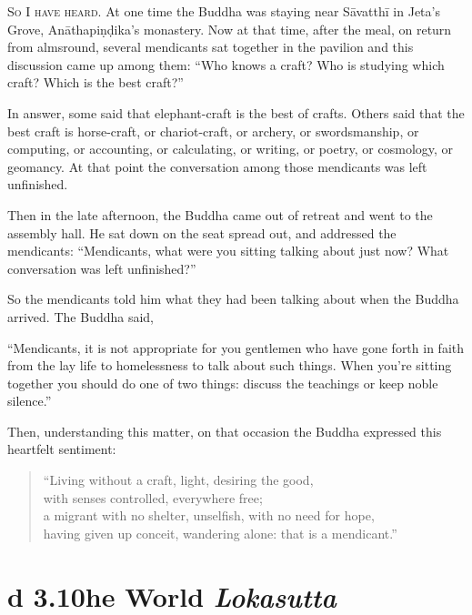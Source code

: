\documentclass[12pt,openany]{book}%
\newcommand*{\suttatitleacronym}[1]{\smaller[2]{#1}\vspace*{.3em}}
\newcommand*{\suttatitletranslation}[1]{\linebreak{#1}}
\newcommand*{\suttatitleroot}[1]{\linebreak\smaller[2]\itshape{#1}}
\newcommand*{\tocacronym}[1]{\hspace*{-3.3em}{#1}\quad}
\newcommand*{\toctranslation}[1]{#1}
\newcommand*{\tocroot}[1]{(\textit{#1})}
\newcommand*{\scevam}[1]{\textsc{#1}}
\begin{document}
\scevam{So I have heard. }At one time the Buddha was staying near \textsanskrit{Sāvatthī} in Jeta’s Grove, \textsanskrit{Anāthapiṇḍika}’s monastery. Now at that time, after the meal, on return from almsround, several mendicants sat together in the pavilion and this discussion came up among them: “Who knows a craft? Who is studying which craft? Which is the best craft?” 

In answer, some said that elephant-craft is the best of crafts. Others said that the best craft is horse-craft, or chariot-craft, or archery, or swordsmanship, or computing, or accounting, or calculating, or writing, or poetry, or cosmology, or geomancy. At that point the conversation among those mendicants was left unfinished. 

Then in the late afternoon, the Buddha came out of retreat and went to the assembly hall. He sat down on the seat spread out, and addressed the mendicants: “Mendicants, what were you sitting talking about just now? What conversation was left unfinished?” 

So the mendicants told him what they had been talking about when the Buddha arrived. The Buddha said, 

“Mendicants, it is not appropriate for you gentlemen who have gone forth in faith from the lay life to homelessness to talk about such things. When you’re sitting together you should do one of two things: discuss the teachings or keep noble silence.” 

Then, understanding this matter, on that occasion the Buddha expressed this heartfelt sentiment: 

\begin{verse}%
“Living without a craft, light, desiring the good, \\
with senses controlled, everywhere free; \\
a migrant with no shelter, unselfish, with no need for hope, \\
having given up conceit, wandering alone: that is a mendicant.” 

%
\end{verse}

%
\section*{{\suttatitleacronym Ud 3.10}{\suttatitletranslation The World }{\suttatitleroot Lokasutta}}
\addcontentsline{toc}{section}{\tocacronym{Ud 3.10} \toctranslation{The World } \tocroot{Lokasutta}}
\end{document}
